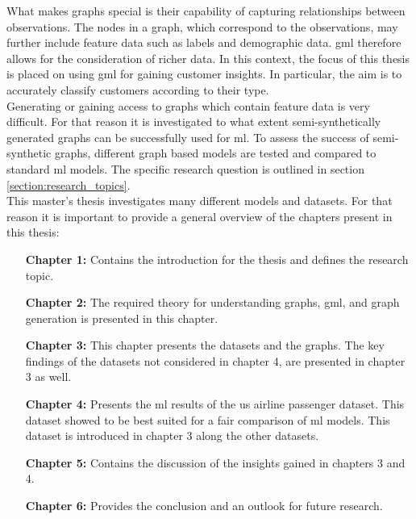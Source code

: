 	\noindent What makes graphs special is their capability of capturing
	relationships between observations. The nodes in a graph, which correspond
	to the observations, may further include feature data such as labels and
	demographic data. \acs{gml} therefore allows for the
	consideration of richer data. In this context, the focus of this thesis is 
	placed on using \acs{gml} for gaining customer insights. In
	particular, the aim is to accurately classify customers according to their
	type. \\

	\noindent Generating or gaining access to graphs which contain feature data 
	is very difficult. For that reason it is investigated to what extent
	semi-synthetically generated graphs can be successfully used for \ac{ml}. 
	To assess the success of semi-synthetic graphs, different graph based models 
	are tested and compared to standard \acs{ml} models. The specific 
	research question is outlined in section \ref{section:research_topics}. \\

	\noindent This master's thesis investigates many different models and
	datasets. For that reason it is important to provide a general overview of
	the chapters present in this thesis:

	\begin{itemize}[leftmargin=1.0in] 
		\item[\textbf{Chapter 1:}] Contains the introduction for the thesis and 
			defines the research topic.
		\item[\textbf{Chapter 2:}] The required theory for understanding
			graphs, \acs{gml}, and graph generation is presented in this 
			chapter.
		\item[\textbf{Chapter 3:}] This chapter presents the datasets and the 
			graphs. The key findings of the datasets not considered in chapter
			4, are presented in chapter 3 as well. 
		\item[\textbf{Chapter 4:}] Presents the \acs{ml} results of the
			\acs{us} airline passenger dataset. This dataset showed to be best 
			suited for a fair comparison of \acs{ml} models. This dataset is 
			introduced in chapter 3 along the other datasets.
		\item[\textbf{Chapter 5:}]  Contains the discussion of the insights 
			gained in chapters 3 and 4.
		\item[\textbf{Chapter 6:}] Provides the conclusion and an outlook for 
			future research.
	\end{itemize}

